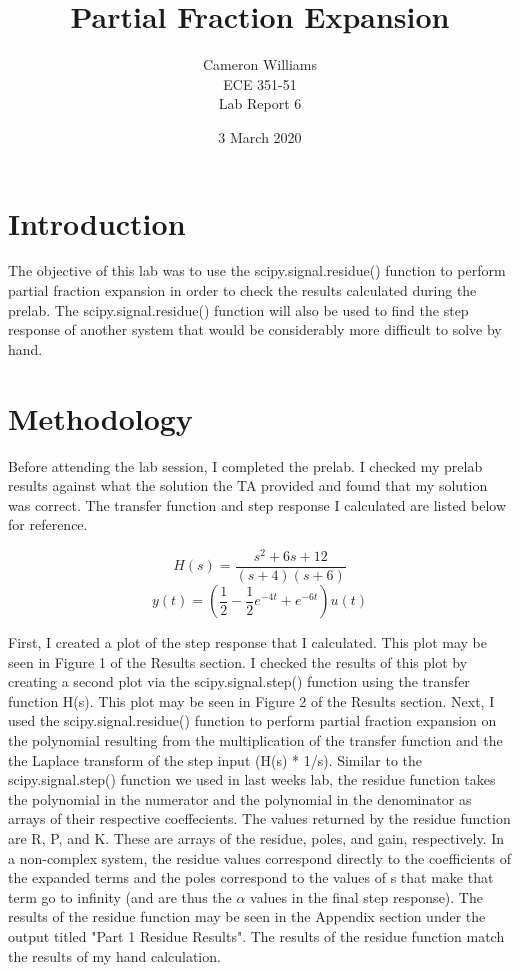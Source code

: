 \documentclass[12pt]{article}
\title{Partial Fraction Expansion}
\author{Cameron Williams\\ECE 351-51\\Lab Report 6}
\date{3 March 2020}
\begin{document}
\vspace{\fill}
\maketitle
\vspace{\fill}
\clearpage

\newpage
\section{Introduction}
    \par The objective of this lab was to use the scipy.signal.residue() function to perform partial fraction expansion in order to check the results calculated during the prelab. The scipy.signal.residue() function will also be used to find the step response of another system that would be considerably more difficult to solve by hand.
    
\newpage

\section{Methodology}
    \par Before attending the lab session, I completed the prelab. I checked my prelab results against what the solution the TA provided and found that my solution was correct. The transfer function and step response I calculated are listed below for reference.

    $$  H(s) = \frac{s^2 + 6s + 12}{(s+4)(s+6)} $$
    $$  y(t) = \left( \frac{1}{2} - \frac{1}{2}e^{-4t} + e^{-6t} \right) u(t) $$
    
    \par First, I created a plot of the step response that I calculated. This plot may be seen in Figure 1 of the Results section. I checked the results of this plot by creating a second plot via the scipy.signal.step() function using the transfer function H(s). This plot may be seen in Figure 2 of the Results section. Next, I used the scipy.signal.residue() function to perform partial fraction expansion on the polynomial resulting from the multiplication of the transfer function and the the Laplace transform of the step input (H(s) * 1/s). Similar to the scipy.signal.step() function we used in last weeks lab, the residue function takes the polynomial in the numerator and the polynomial in the denominator as arrays of their respective coeffecients. The values returned by the residue function are R, P, and K. These are arrays of the residue, poles, and gain, respectively. In a non-complex system, the residue values correspond directly to the coefficients of the expanded terms and the poles correspond to the values of s that make that term go to infinity (and are thus the $\alpha$ values in the final step response). The results of the residue function may be seen in the Appendix section under the output titled "Part 1 Residue Results". The results of the residue function match the results of my hand calculation.
    
\end{document}
